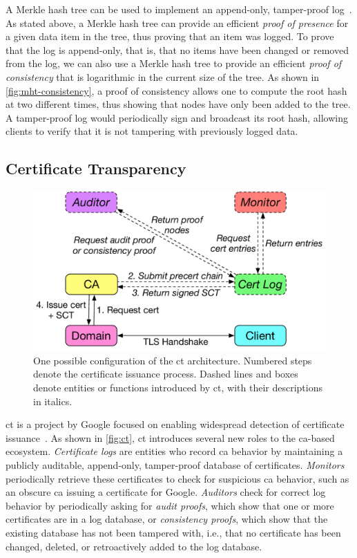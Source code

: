 A Merkle hash tree can be used to implement an append-only, tamper-proof
log~\cite{crosby2009efficient}. As stated above, a Merkle hash tree can provide
an efficient \emph{proof of presence} for a given data item in the tree, thus
proving that an item was logged. To prove that the log is append-only, that is,
that no items have been changed or removed from the log, we can also use a
Merkle hash tree to provide an efficient \emph{proof of consistency} that is
logarithmic in the current size of the tree. As shown in
\autoref{fig:mht-consistency}, a proof of consistency allows one to compute the
root hash at two different times, thus showing that nodes have only been added
to the tree. A tamper-proof log would periodically sign and broadcast its root
hash, allowing clients to verify that it is not tampering with previously logged
data.

\subsection{Certificate Transparency}
\label{sec:background:ct}

\begin{figure}
  \centering
  \includegraphics[width=\linewidth]{fig/ct}
  \caption{One possible configuration of the \ac{ct} architecture. Numbered
  steps denote the certificate issuance process. Dashed lines and boxes denote
entities or functions introduced by \ac{ct}, with their descriptions in
italics.}
  \label{fig:ct}
\end{figure}

\acf{ct} is a project by Google focused on enabling widespread detection of
certificate issuance~\cite{rfc6962}. As shown in \autoref{fig:ct}, \ac{ct}
introduces several new roles to the \ac{ca}-based ecosystem. \emph{Certificate
logs} are entities who record \ac{ca} behavior by maintaining a publicly
auditable, append-only, tamper-proof database of certificates. \emph{Monitors}
periodically retrieve these certificates to check for suspicious \ac{ca}
behavior, such as an obscure \ac{ca} issuing a certificate for Google.
\emph{Auditors} check for correct log behavior by periodically asking for
\emph{audit proofs}, which show that one or more certificates are in a log
database, or \emph{consistency proofs}, which show that the existing database
has not been tampered with, i.e., that no certificate has been changed, deleted,
or retroactively added to the log database.

